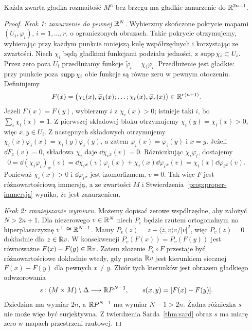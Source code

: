 \begin{twierdzenie}
\label{thm:whitney-slabe}
Każda zwarta gładka rozmaitość $M^n$ bez brzegu
ma gładkie zanurzenie do $\mathbb{R}^{2n+1}$.
\end{twierdzenie}
\begin{proof}
\emph{Krok 1: zanurzenie do pewnej $\mathbb{R}^N$.}
Wybierzmy skończone pokrycie mapami $(U_i,\varphi_i)$,
$i=1,\ldots,r$, o ograniczonych obrazach. Takie pokrycie
otrzymujemy, wybierając przy każdym punkcie mniejszą
kulę współrzędnych i korzystając ze zwartości. Niech $\chi_i$ będą gładkimi
funkcjami podziału jedności, z
$\operatorname{supp}\chi_i\subset U_i$. Przez zero poza $U_i$
przedłużamy funkcje
$\widetilde\varphi_i=\chi_i\varphi_i$.
Przedłużenie jest gładkie: przy punkcie poza
$\operatorname{supp}\chi_i$ obie funkcje są równe zeru
w pewnym otoczeniu. Definiujemy
\[
 F(x)=\bigl(\chi_1(x),\widetilde\varphi_1(x);
       \ldots;\chi_r(x),\widetilde\varphi_r(x)\bigr)
       \in\mathbb{R}^{r(n+1)}.
\]
Jeżeli $F(x)=F(y)$, wybierzmy $i$ z
$\chi_i(x)>0$; istnieje taki $i$, bo
$\sum_i\chi_i(x)=1$. Z pierwszej składowej
bloku otrzymujemy $\chi_i(y)=\chi_i(x)>0$,
więc $x,y\in U_i$. Z następnych składowych
otrzymujemy
$\chi_i(x)\varphi_i(x)=\chi_i(y)\varphi_i(y)$,
a zatem $\varphi_i(x)=\varphi_i(y)$ i $x=y$.
Jeżeli $\dd F_x(v)=0$, składowa $\chi_i$
daje $\dd\chi_i{}_x(v)=0$. Różniczkując
$\chi_i\varphi_i$, dostajemy
\[
 0=\dd(\chi_i\varphi_i)_x(v)
 =\dd\chi_i{}_x(v)\varphi_i(x)
       +\chi_i(x)\dd\varphi_i{}_x(v)
 =\chi_i(x)\dd\varphi_i{}_x(v).
\]
Ponieważ $\chi_i(x)>0$ i $\dd\varphi_i{}_x$
jest izomorfizmem, $v=0$. Tak więc $F$
jest różnowartościową immersją, a ze
zwartości $M$ i Stwierdzenia~\ref{prop:proper-immersja}
wynika, że jest zanurzeniem.

\emph{Krok 2: zmniejszanie wymiaru.}
Możemy dopisać zerowe współrzędne, aby
założyć $N>2n+1$. Dla niezerowego
$v\in\mathbb{R}^N$ niech $P_v$ będzie rzutem
ortogonalnym na hiperpłaszczyznę
$v^\perp\cong\mathbb{R}^{N-1}$. Mamy
$P_v(z)=z-\langle z,v\rangle v/|v|^2$,
więc $P_v(z)=0$ dokładnie dla $z\in\mathbb{R} v$.
W konsekwencji
$P_v(F(x))=P_v(F(y))$ jest równoważne
$F(x)-F(y)\in\mathbb{R} v$.
Zatem złożenie $P_v\circ F$
przestaje być różnowartościowe dokładnie
wtedy, gdy prosta $\mathbb{R} v$ jest kierunkiem
siecznej $F(x)-F(y)$ dla pewnych $x\ne y$.
Zbiór tych kierunków jest obrazem
gładkiego odwzorowania
\[
 s:(M\times M)\setminus\Delta\longrightarrow
       \mathbb{R} P^{N-1},\qquad
 s(x,y)=[F(x)-F(y)].
\]
Dziedzina ma wymiar $2n$, a $\mathbb{R} P^{N-1}$
ma wymiar $N-1>2n$. Żadna różniczka $s$
nie może więc być surjektywna.
Z twierdzenia Sarda~\ref{thm:sard} obraz
$s$ ma miarę zero w mapach przestrzeni
rzutowej.


\end{proof}
